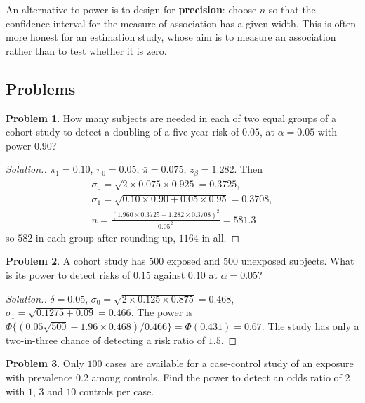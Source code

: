 \documentclass[11pt,a4paper]{article}
\numberwithin{equation}{section}
\theoremstyle{definition}
\newtheorem{problemx}{Problem}[subsection]
\newenvironment{problem}{\begin{problemx}}{\end{problemx}}
\newenvironment{solution}
  {\renewcommand{\qedsymbol}{}\begin{proof}[\textit{Solution}.]}
  {\end{proof}}
\begin{document}
An alternative to power is to design for \textbf{precision}: choose $n$ so that the confidence interval for the measure of association has
a given width. This is often more honest for an estimation study, whose aim is to measure an association rather than to test whether it
is zero.

\subsection{Problems}

\begin{problem}
How many subjects are needed in each of two equal groups of a cohort study to detect a doubling of a five-year risk of $0.05$, at $\alpha = 0.05$
with power $0.90$?
\end{problem}

\begin{solution}
$\pi_1 = 0.10$, $\pi_0 = 0.05$, $\bar\pi = 0.075$, $z_\beta = 1.282$. Then
\begin{gather*}
\sigma_0 = \sqrt{2 \times 0.075 \times 0.925} = 0.3725, \\
\sigma_1 = \sqrt{0.10 \times 0.90 + 0.05 \times 0.95} = 0.3708, \\
n = \frac{(1.960 \times 0.3725 + 1.282 \times 0.3708)^2}{0.05^2} = 581.3
\end{gather*}
so $582$ in each group after rounding up, $1164$ in all.
\end{solution}

\begin{problem}
A cohort study has $500$ exposed and $500$ unexposed subjects. What is its power to detect risks of $0.15$ against $0.10$ at $\alpha = 0.05$?
\end{problem}

\begin{solution}
$\delta = 0.05$, $\sigma_0 = \sqrt{2 \times 0.125 \times 0.875} = 0.468$, $\sigma_1 = \sqrt{0.1275 + 0.09} = 0.466$. The power is
$\Phi\{(0.05\sqrt{500} - 1.96 \times 0.468)/0.466\} = \Phi(0.431) = 0.67$. The study has only a two-in-three chance of detecting a risk ratio of $1.5$.
\end{solution}

\begin{problem}
Only $100$ cases are available for a case-control study of an exposure with prevalence $0.2$ among controls. Find the power to detect
an odds ratio of $2$ with $1$, $3$ and $10$ controls per case.
\end{problem}
\end{document}

